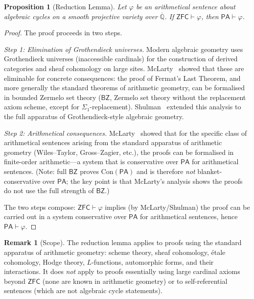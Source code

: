 \documentclass[11pt,a4paper]{article}
\theoremstyle{plain}
\newtheorem{proposition}[theorem]{Proposition}
\theoremstyle{definition}
\newtheorem{remark}[theorem]{Remark}
\newcommand{\PA}{\textsf{PA}}
\newcommand{\ZFC}{\textsf{ZFC}}
\newcommand{\Q}{\mathbb{Q}}
\begin{document}
\begin{proposition}[Reduction Lemma]\label{prop:reduction}
Let $\varphi$ be an arithmetical sentence about algebraic cycles on a smooth projective variety over $\overline{\Q}$.  If $\ZFC \vdash \varphi$, then $\PA \vdash \varphi$.
\end{proposition}

\begin{proof}
The proof proceeds in two steps.

\emph{Step 1: Elimination of Grothendieck universes.}  Modern algebraic geometry uses Grothendieck universes (inaccessible cardinals) for the construction of derived categories and sheaf cohomology on large sites.  McLarty~\cite{mclarty2010} showed that these are eliminable for concrete consequences: the proof of Fermat's Last Theorem, and more generally the standard theorems of arithmetic geometry, can be formalised in bounded Zermelo set theory ($\textsf{BZ}$, Zermelo set theory without the replacement axiom scheme, except for $\Sigma_1$-replacement).  Shulman~\cite{shulman2010} extended this analysis to the full apparatus of Grothendieck-style algebraic geometry.

\emph{Step 2: Arithmetical consequences.}  McLarty~\cite{mclarty2010} showed that for the specific class of arithmetical sentences arising from the standard apparatus of arithmetic geometry (Wiles--Taylor, Gross--Zagier, etc.), the proofs can be formalised in finite-order arithmetic---a system that is conservative over $\PA$ for arithmetical sentences.  (Note: full $\textsf{BZ}$ proves $\mathrm{Con}(\PA)$ and is therefore \emph{not} blanket-conservative over $\PA$; the key point is that McLarty's analysis shows the proofs do not use the full strength of $\textsf{BZ}$.)

The two steps compose: $\ZFC \vdash \varphi$ implies (by McLarty/Shulman) the proof can be carried out in a system conservative over $\PA$ for arithmetical sentences, hence $\PA \vdash \varphi$.
\end{proof}

\begin{remark}[Scope]
The reduction lemma applies to proofs using the standard apparatus of arithmetic geometry: scheme theory, sheaf cohomology, \'etale cohomology, Hodge theory, $L$-functions, automorphic forms, and their interactions.  It does \emph{not} apply to proofs essentially using large cardinal axioms beyond $\ZFC$ (none are known in arithmetic geometry) or to self-referential sentences (which are not algebraic cycle statements).
\end{remark}
\end{document}
